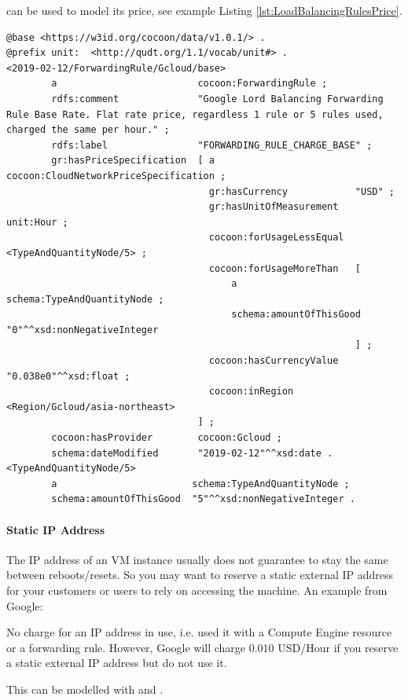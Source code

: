  can be used to model its price, see example Listing \ref{lst:LoadBalancingRulesPrice}.

\begin{lstlisting}[caption={Load Balancing Rules Price},label={lst:LoadBalancingRulesPrice}]
@base <https://w3id.org/cocoon/data/v1.0.1/> .
@prefix unit:  <http://qudt.org/1.1/vocab/unit#> .
<2019-02-12/ForwardingRule/Gcloud/base>
        a                         cocoon:ForwardingRule ;
        rdfs:comment              "Google Lord Balancing Forwarding Rule Base Rate. Flat rate price, regardless 1 rule or 5 rules used, charged the same per hour." ;
        rdfs:label                "FORWARDING_RULE_CHARGE_BASE" ;
        gr:hasPriceSpecification  [ a                         cocoon:CloudNetworkPriceSpecification ;
                                    gr:hasCurrency            "USD" ;
                                    gr:hasUnitOfMeasurement   unit:Hour ;
                                    cocoon:forUsageLessEqual  <TypeAndQuantityNode/5> ;
                                    cocoon:forUsageMoreThan   [ 
                                        a                        schema:TypeAndQuantityNode ;
                                        schema:amountOfThisGood  "0"^^xsd:nonNegativeInteger
                                                              ] ;
                                    cocoon:hasCurrencyValue   "0.038e0"^^xsd:float ;
                                    cocoon:inRegion          <Region/Gcloud/asia-northeast>
                                  ] ;
        cocoon:hasProvider        cocoon:Gcloud ;
        schema:dateModified       "2019-02-12"^^xsd:date .
<TypeAndQuantityNode/5>
        a                        schema:TypeAndQuantityNode ;
        schema:amountOfThisGood  "5"^^xsd:nonNegativeInteger .
\end{lstlisting}

\paragraph{Static IP Address}
The IP address of an VM instance usually does not guarantee to stay the same between
reboots/resets. So you may want to reserve a static external IP address for
your customers or users to rely on accessing the machine.
An example from Google: 
\begin{displayquote}
No charge for an IP address in use,
i.e. used it with a Compute Engine resource or a forwarding rule.
However, Google will charge 0.010 USD/Hour if you reserve a static external IP address but do not use it.
\end{displayquote}
This can be modelled with  and .

